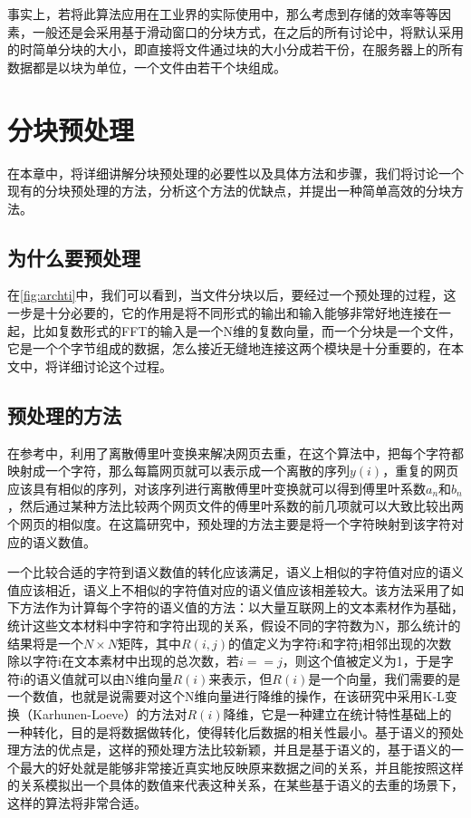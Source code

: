 事实上，若将此算法应用在工业界的实际使用中，那么考虑到存储的效率等等因素，一般还是会采用基于滑动窗口的分块方式，在之后的所有讨论中，将默认采用的时简单分块的大小，即直接将文件通过块的大小分成若干份，在服务器上的所有数据都是以块为单位，一个文件由若干个块组成。

\section{分块预处理}
\label{sec:proproc}

在本章中，将详细讲解分块预处理的必要性以及具体方法和步骤，我们将讨论一个现有的分块预处理的方法，分析这个方法的优缺点，并提出一种简单高效的分块方法。

\subsection{为什么要预处理}
\label{sec:why}

在\ref{fig:archti}中，我们可以看到，当文件分块以后，要经过一个预处理的过程，这一步是十分必要的，它的作用是将不同形式的输出和输入能够非常好地连接在一起，比如复数形式的FFT的输入是一个N维的复数向量，而一个分块是一个文件，它是一个个字节组成的数据，怎么接近无缝地连接这两个模块是十分重要的，在本文中，将详细讨论这个过程。

\subsection{预处理的方法}
\label{sec:appro}

在{参考}中，利用了离散傅里叶变换来解决网页去重，在这个算法中，把每个字符都映射成一个字符，那么每篇网页就可以表示成一个离散的序列$y(i)$，重复的网页应该具有相似的序列，对该序列进行离散傅里叶变换就可以得到傅里叶系数$a_n$和$b_n$，然后通过某种方法比较两个网页文件的傅里叶系数的前几项就可以大致比较出两个网页的相似度。在这篇研究中，预处理的方法主要是将一个字符映射到该字符对应的语义数值。

一个比较合适的字符到语义数值的转化应该满足，语义上相似的字符值对应的语义值应该相近，语义上不相似的字符值对应的语义值应该相差较大。该方法采用了如下方法作为计算每个字符的语义值的方法：以大量互联网上的文本素材作为基础，统计这些文本材料中字符和字符出现的关系，假设不同的字符数为N，那么统计的结果将是一个$N \times N$矩阵，其中$R(i, j)$的值定义为字符i和字符j相邻出现的次数除以字符i在文本素材中出现的总次数，若$i==j$，则这个值被定义为1，于是字符i的语义值就可以由N维向量$R(i)$来表示，但$R(i)$是一个向量，我们需要的是一个数值，也就是说需要对这个N维向量进行降维的操作，在该研究中采用K-L变换（Karhunen-Loeve）的方法对$R(i)$降维，它是一种建立在统计特性基础上的一种转化，目的是将数据做转化，使得转化后数据的相关性最小。基于语义的预处理方法的优点是，这样的预处理方法比较新颖，并且是基于语义的，基于语义的一个最大的好处就是能够非常接近真实地反映原来数据之间的关系，并且能按照这样的关系模拟出一个具体的数值来代表这种关系，在某些基于语义的去重的场景下，这样的算法将非常合适。

